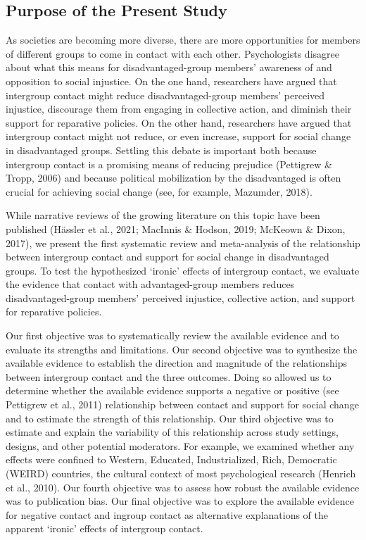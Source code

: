 \documentclass[12pt, letterpaper]{article}
\begin{document}
\hypertarget{purpose-of-the-present-study}{%
\subsection{Purpose of the Present
Study}\label{purpose-of-the-present-study}}

As societies are becoming more diverse, there are more opportunities for
members of different groups to come in contact with each other.
Psychologists disagree about what this means for disadvantaged-group
members' awareness of and opposition to social injustice. On the one
hand, researchers have argued that intergroup contact might reduce
disadvantaged-group members' perceived injustice, discourage them from
engaging in collective action, and diminish their support for reparative
policies. On the other hand, researchers have argued that intergroup
contact might not reduce, or even increase, support for social change in
disadvantaged groups. Settling this debate is important both because
intergroup contact is a promising means of reducing prejudice (Pettigrew
\& Tropp, 2006) and because political mobilization by the disadvantaged
is often crucial for achieving social change (see, for example,
Mazumder, 2018).

While narrative reviews of the growing literature on this topic have
been published (Hässler et al., 2021; MacInnis \& Hodson, 2019; McKeown
\& Dixon, 2017), we present the first systematic review and
meta-analysis of the relationship between intergroup contact and support
for social change in disadvantaged groups. To test the hypothesized
`ironic' effects of intergroup contact, we evaluate the evidence that
contact with advantaged-group members reduces disadvantaged-group
members' perceived injustice, collective action, and support for
reparative policies.

Our first objective was to systematically review the available evidence
and to evaluate its strengths and limitations. Our second objective was
to synthesize the available evidence to establish the direction and
magnitude of the relationships between intergroup contact and the three
outcomes. Doing so allowed us to determine whether the available
evidence supports a negative or positive (see Pettigrew et al., 2011)
relationship between contact and support for social change and to
estimate the strength of this relationship. Our third objective was to
estimate and explain the variability of this relationship across study
settings, designs, and other potential moderators. For example, we
examined whether any effects were confined to Western, Educated,
Industrialized, Rich, Democratic (WEIRD) countries, the cultural context
of most psychological research (Henrich et al., 2010). Our fourth
objective was to assess how robust the available evidence was to
publication bias. Our final objective was to explore the available
evidence for negative contact and ingroup contact as alternative
explanations of the apparent `ironic' effects of intergroup contact.
\end{document}
